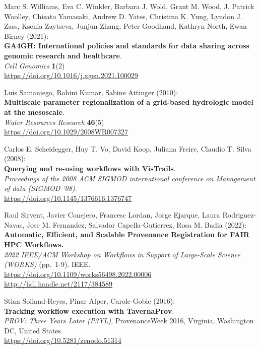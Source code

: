 \documentclass[10pt,letterpaper]{article}
\begin{document}
\begin{thebibliography}{10}
\begin{small}
Marc S. Williams, Eva C. Winkler, Barbara J. Wold, Grant M. Wood, J. Patrick Woolley, Chisato Yamasaki, Andrew D. Yates, Christina K. Yung, Lyndon J. Zass, Ksenia Zaytseva, Junjun Zhang, Peter Goodhand, Kathryn North, Ewan Birney (2021):\\
\textbf{GA4GH: International policies and standards for data sharing
across genomic research and healthcare}.\\
\emph{Cell Genomics} \textbf{1}(2)\\
\url{https://doi.org/10.1016/j.xgen.2021.100029}

Luis Samaniego, Rohini Kumar, Sabine Attinger (2010):\\
\textbf{Multiscale parameter regionalization of a grid-based hydrologic model at the mesoscale}.\\
\emph{Water Resources Research} \textbf{46}(5)\\
\url{https://doi.org/10.1029/2008WR007327}

 Carlos E. Scheidegger, Huy T. Vo, David Koop, Juliana Freire, Claudio T. Silva (2008):\\
\textbf{Querying and re-using workflows with VisTrails}.\\
\emph{Proceedings of the 2008 ACM SIGMOD international conference on Management of data (SIGMOD '08)}.\\
\url{https://doi.org/10.1145/1376616.1376747}

Raul Sirvent, Javier Conejero, Francesc Lordan, Jorge Ejarque, Laura Rodriguez-Navas, Jose M. Fernandez, Salvador Capella-Gutierrez, Rosa M. Badia (2022):\\
\textbf{Automatic, Efficient, and Scalable Provenance Registration for
FAIR HPC Workflows.}\\
\emph{2022 IEEE/ACM Workshop on Workflows in Support of Large-Scale Science (WORKS)} (pp.~1-9). IEEE.\\
\url{https://doi.org/10.1109/works56498.2022.00006}\\
\url{http://hdl.handle.net/2117/384589}


Stian Soiland-Reyes, Pinar Alper, Carole Goble (2016):\\
\textbf{Tracking workflow execution with TavernaProv}.\\
\emph{PROV: Three Years Later (P3YL)}, ProvenanceWeek 2016, Virginia, Washington DC, United States. \\
\url{https://doi.org/10.5281/zenodo.51314}


\end{small}
\end{thebibliography}
\end{document}
